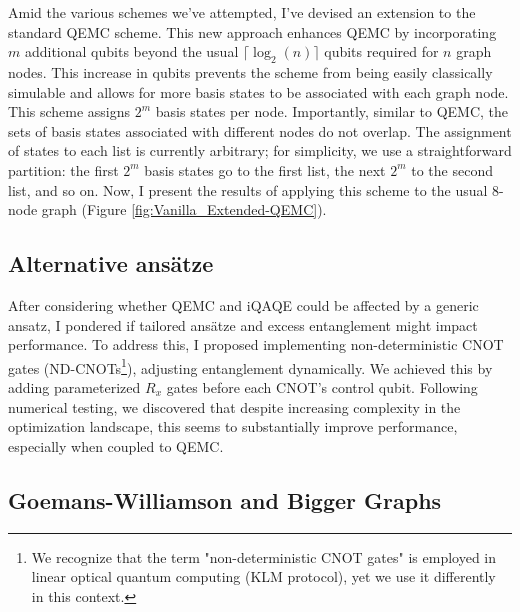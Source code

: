 Amid the various schemes we've attempted, I've devised an extension to the standard QEMC scheme. This new approach enhances QEMC by incorporating $m$ additional qubits beyond the usual $\lceil\log_2(n)\rceil$ qubits required for $n$ graph nodes. This increase in qubits prevents the scheme from being easily classically simulable and allows for more basis states to be associated with each graph node. This scheme assigns $2^m$ basis states per node. Importantly, similar to QEMC, the sets of basis states associated with different nodes do not overlap. The assignment of states to each list is currently arbitrary; for simplicity, we use a straightforward partition: the first $2^m$ basis states go to the first list, the next $2^m$ to the second list, and so on. Now, I present the results of applying this scheme to the usual $8$-node graph (Figure \ref{fig:Vanilla_Extended-QEMC}).

\subsection{Alternative ansätze}
\label{subsection:Alternative_Ansätze}
After considering whether QEMC and iQAQE could be affected by a generic ansatz, I pondered if tailored ansätze and excess entanglement might impact performance. To address this, I proposed implementing non-deterministic CNOT gates (ND-CNOTs\footnote{We recognize that the term "non-deterministic CNOT gates" is employed in linear optical quantum computing (KLM protocol), yet we use it differently in this context.}), adjusting entanglement dynamically. We achieved this by adding parameterized $R_x$ gates before each CNOT's control qubit. Following numerical testing, we discovered that despite increasing complexity in the optimization landscape, this seems to substantially improve performance, especially when coupled to QEMC.

\subsection{Goemans-Williamson and Bigger Graphs}
\label{subsection:GW_Bigger_Graphs}


